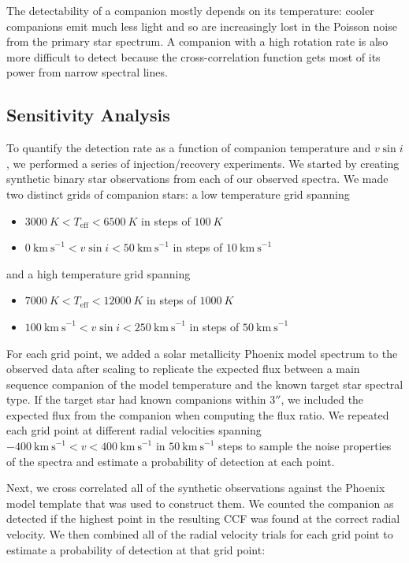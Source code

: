\documentclass{emulateapj}
\begin{document}
The detectability of a companion mostly depends on its temperature: cooler companions emit much less light and so are increasingly lost in the Poisson noise from the primary star spectrum. A companion with a high rotation rate is also more difficult to detect because the cross-correlation function gets most of its power from narrow spectral lines.  

\subsection{Sensitivity Analysis}

To quantify the detection rate as a function of companion temperature and $v\sin{i}$, we performed a series of injection/recovery experiments. We started by creating synthetic binary star observations from each of our observed spectra. We made two distinct grids of companion stars: a low temperature grid spanning

\begin{itemize}
\item $3000\ K < T_\mathrm{eff} < 6500\ K$ in steps of $100\ K$
\item $0\ \mathrm{km\ s}^{-1} < v\sin{i} < 50\ \mathrm{km\ s}^{-1}$ in steps of $10\ \mathrm{km\ s}^{-1}$
\end{itemize}
and a high temperature grid spanning

\begin{itemize}
\item $7000\ K < T_\mathrm{eff} < 12000\ K$ in steps of $1000\ K$
\item $100\ \mathrm{km\ s}^{-1} < v\sin{i} < 250\ \mathrm{km\ s}^{-1}$ in steps of $50\ \mathrm{km\ s}^{-1}$
\end{itemize}
For each grid point, we added a solar metallicity Phoenix model spectrum to the observed data after scaling to replicate the expected flux between a main sequence companion of the model temperature and the known target star spectral type. If the target star had known companions within $3''$, we included the expected flux from the companion when computing the flux ratio. We repeated each grid point at different radial velocities spanning $-400\ \mathrm{km\ s}^{-1} < v < 400\ \mathrm{km\ s}^{-1}$ in $50\ \mathrm{km\ s}^{-1}$ steps to sample the noise properties of the spectra and estimate a probability of detection at each point.

Next, we cross correlated all of the synthetic observations against the Phoenix model template that was used to construct them. We counted the companion as detected if the highest point in the resulting CCF was found at the correct radial velocity. We then combined all of the radial velocity trials for each grid point to estimate a probability of detection at that grid point:
\end{document}
